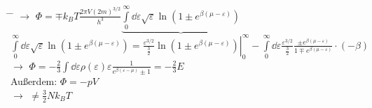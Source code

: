 \begin{tabbing}
\hspace{4em} \= \hspace{4em} \= \kill
$\rightarrow$\> $\Phi = \mp k_B T \frac{2\pi V (2 m)^{3/2}}{h^3} \underbrace{\int\limits_0^{\infty}\dd{\varepsilon}\sqrt{\varepsilon}\ln\left(1\pm e^{\beta(\mu - \varepsilon)}\right)}$\\
$\int\limits_0^{\infty}\dd{\varepsilon}\sqrt{\varepsilon}\ln\left(1\pm e^{\beta(\mu - \varepsilon)}\right) = \left.\frac{\varepsilon^{3/2}}{\frac{3}{2}}\ln\left(1\pm e^{\beta (\mu -\varepsilon)}\right)\right|_0^{\infty} - \int\limits_0^{\infty}\dd{\varepsilon}\frac{\varepsilon^{3/2}}{\frac{3}{2}} \frac{\pm e^{\beta(\mu -\varepsilon)}}{1\mp e^{\beta (\mu -\varepsilon)}}\cdot(-\beta)$\\
$\rightarrow$\> $\Phi = -\frac{2}{3}\int\dd{\varepsilon}\rho(\varepsilon)\varepsilon\frac{1}{e^{\beta (\varepsilon -\mu)}\pm 1} = -\frac{2}{3} E$\\
Außerdem: $\Phi = - p V$\\
$\rightarrow$\> $\neq\frac{3}{2}N k_B T$
\end{tabbing}


